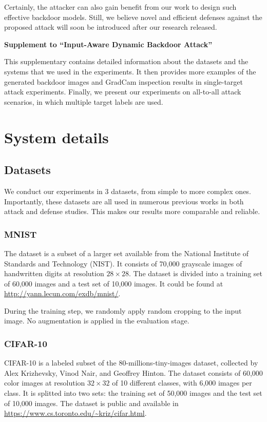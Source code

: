 \documentclass{article}
\begin{document}
Certainly, the attacker can also gain benefit from our work to design such effective backdoor models. Still, we believe novel and efficient defenses against the proposed attack will soon be introduced after our research released.

\medskip

\small




\newpage
\normalsize

\appendix
\begin{center}
\textbf{\Large{Supplement to ``Input-Aware Dynamic Backdoor Attack''}}
\end{center}

This supplementary contains detailed information about the datasets and the systems that we used in the experiments. It then provides more examples of the generated backdoor images and GradCam inspection results in single-target attack experiments. Finally, we present our experiments on all-to-all attack scenarios, in which multiple target labels are used.
\section{System details}
\subsection{Datasets}
    We conduct our experiments in 3 datasets, from simple to more complex ones. Importantly, these datasets are all used in numerous previous works in both attack and defense studies. This makes our results more comparable and reliable.
\subsubsection{MNIST} The dataset \cite{lecun1998gradient} is a subset of a larger set available from the National Institute of Standards and Technology (NIST). It consists of 70,000 grayscale images of handwritten digits at resolution $28 \times 28$. The dataset is divided into a training set of 60,000 images and a test set of 10,000 images. It could be found at \url{http://yann.lecun.com/exdb/mnist/}.

During the training step, we randomly apply random cropping to the input image. No augmentation is applied in the evaluation stage.
\subsubsection{CIFAR-10}
CIFAR-10 \cite{krizhevsky2009learning} is a labeled subset of the 80-millions-tiny-images dataset, collected by Alex Krizhevsky, Vinod Nair, and Geoffrey Hinton. The dataset consists of 60,000 color images at resolution $32 \times 32$ of 10 different classes, with 6,000 images per class. It is splitted into two sets: the training set of 50,000 images and the test set of 10,000 images. The dataset is public and available in \url{https://www.cs.toronto.edu/~kriz/cifar.html}.
\end{document}

